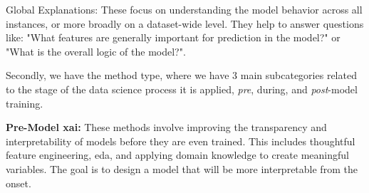 Global Explanations: These focus on understanding the model behavior across all instances, or more broadly on a dataset-wide level. They help to answer questions like: "What features are generally important for prediction in the model?" or "What is the overall logic of the model?". 

Secondly, we have the method type, where we have 3 main subcategories related to the stage of the data science process it is applied, \textit{pre}, during, and \textit{post}-model training.

\textbf{Pre-Model \ac{xai}:} These methods involve improving the transparency and interpretability of models before they are even trained. This includes thoughtful feature engineering, \ac{eda}, and applying domain knowledge to create meaningful variables. The goal is to design a model that will be more interpretable from the onset.

